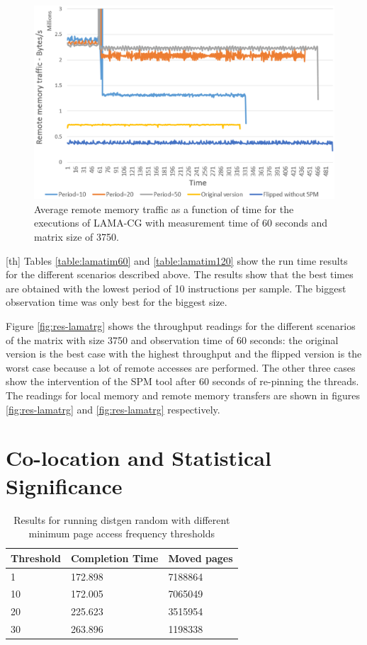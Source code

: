 \begin{figure}
	\centering
		\includegraphics[width=\textwidth]{figures/lama-remotetr.eps}
		\caption{Average remote memory traffic as a function of time for the executions of LAMA-CG with measurement time of 60 seconds and matrix size of 3750.}
		\label{fig:res-lamaremotr}
\end{figure}[th]
Tables \ref{table:lamatim60} and \ref{table:lamatim120} show the run time results for the different scenarios described above. The results show that the best times are obtained with the lowest period of 10 instructions per sample. The biggest observation time was only best for the biggest size.

Figure \ref{fig:res-lamatrg} shows the throughput readings for the different scenarios of the matrix with size 3750 and observation time of 60 seconds: the original version is the best case with the highest throughput and the flipped version is the worst case because a lot of remote accesses are performed. The other three cases show the intervention of the SPM tool after 60 seconds of re-pinning the threads. The readings for local memory and remote memory transfers are shown in figures \ref{fig:res-lamatrg} and \ref{fig:res-lamatrg} respectively.
\section{Co-location and Statistical Significance}\label{section:resssigni}

\begin{table}
	\centering
		\begin{tabularx}{.7\textwidth}{|l|l|X|}
		\hline
			Threshold & Completion Time & Moved pages  \\
			\hline
			1 & 172.898 & 7188864 \\
			\hline
			10 & 172.005 & 7065049 \\
			\hline
			20 & 225.623 & 3515954 \\
			\hline
			30 & 263.896 & 1198338 \\
			\hline
		\end{tabularx}
		\caption{Results for running distgen random with different minimum page access frequency thresholds}
		\label{table:res-dgenfreqrdm}
\end{table}


